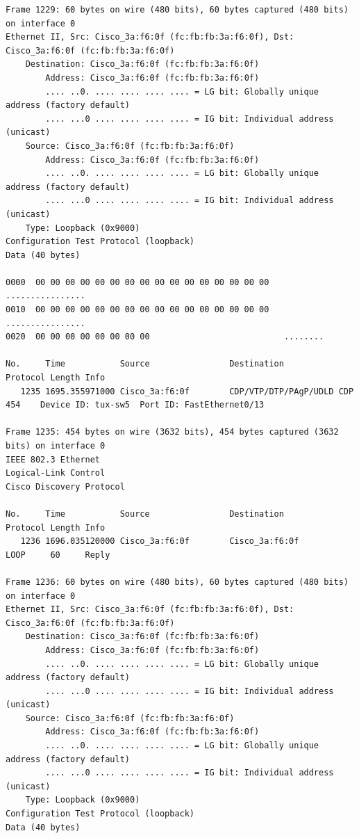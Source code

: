\documentclass[a4paper,11pt]{article}
\begin{document}
\begin{lstlisting}
Frame 1229: 60 bytes on wire (480 bits), 60 bytes captured (480 bits) on interface 0
Ethernet II, Src: Cisco_3a:f6:0f (fc:fb:fb:3a:f6:0f), Dst: Cisco_3a:f6:0f (fc:fb:fb:3a:f6:0f)
    Destination: Cisco_3a:f6:0f (fc:fb:fb:3a:f6:0f)
        Address: Cisco_3a:f6:0f (fc:fb:fb:3a:f6:0f)
        .... ..0. .... .... .... .... = LG bit: Globally unique address (factory default)
        .... ...0 .... .... .... .... = IG bit: Individual address (unicast)
    Source: Cisco_3a:f6:0f (fc:fb:fb:3a:f6:0f)
        Address: Cisco_3a:f6:0f (fc:fb:fb:3a:f6:0f)
        .... ..0. .... .... .... .... = LG bit: Globally unique address (factory default)
        .... ...0 .... .... .... .... = IG bit: Individual address (unicast)
    Type: Loopback (0x9000)
Configuration Test Protocol (loopback)
Data (40 bytes)

0000  00 00 00 00 00 00 00 00 00 00 00 00 00 00 00 00   ................
0010  00 00 00 00 00 00 00 00 00 00 00 00 00 00 00 00   ................
0020  00 00 00 00 00 00 00 00                           ........

No.     Time           Source                Destination           Protocol Length Info
   1235 1695.355971000 Cisco_3a:f6:0f        CDP/VTP/DTP/PAgP/UDLD CDP      454    Device ID: tux-sw5  Port ID: FastEthernet0/13  

Frame 1235: 454 bytes on wire (3632 bits), 454 bytes captured (3632 bits) on interface 0
IEEE 802.3 Ethernet 
Logical-Link Control
Cisco Discovery Protocol

No.     Time           Source                Destination           Protocol Length Info
   1236 1696.035120000 Cisco_3a:f6:0f        Cisco_3a:f6:0f        LOOP     60     Reply

Frame 1236: 60 bytes on wire (480 bits), 60 bytes captured (480 bits) on interface 0
Ethernet II, Src: Cisco_3a:f6:0f (fc:fb:fb:3a:f6:0f), Dst: Cisco_3a:f6:0f (fc:fb:fb:3a:f6:0f)
    Destination: Cisco_3a:f6:0f (fc:fb:fb:3a:f6:0f)
        Address: Cisco_3a:f6:0f (fc:fb:fb:3a:f6:0f)
        .... ..0. .... .... .... .... = LG bit: Globally unique address (factory default)
        .... ...0 .... .... .... .... = IG bit: Individual address (unicast)
    Source: Cisco_3a:f6:0f (fc:fb:fb:3a:f6:0f)
        Address: Cisco_3a:f6:0f (fc:fb:fb:3a:f6:0f)
        .... ..0. .... .... .... .... = LG bit: Globally unique address (factory default)
        .... ...0 .... .... .... .... = IG bit: Individual address (unicast)
    Type: Loopback (0x9000)
Configuration Test Protocol (loopback)
Data (40 bytes)


\end{lstlisting}
\end{document}
